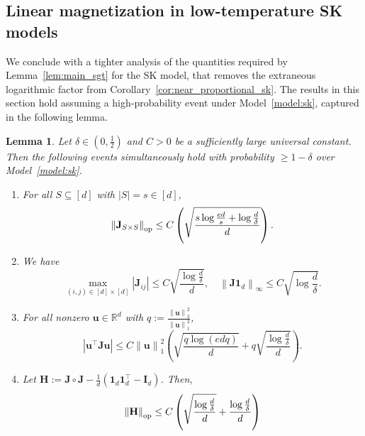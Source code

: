 \documentclass[11pt]{article}
\newtheorem{lemma}{Lemma}
\newcommand{\defeq}{:=}
\newcommand{\norm}[1]{\left\lVert#1\right\rVert}
\newcommand{\normop}[1]{\left\lVert#1\right\rVert_{\textup{op}}}
\newcommand{\R}{\mathbb{R}}
\newcommand{\half}{\frac{1}{2}}
\newcommand{\1}{\mathbf{1}}
\newcommand{\0}{\mathbf{0}}
\newcommand{\id}{\mathbf{I}}
\newcommand{\Par}[1]{\left(#1\right)}
\newcommand{\Abs}[1]{\left|#1\right|}
\newcommand{\mh}{{\mathbf{H}}}
\newcommand{\mj}{{\mathbf{J}}}
\newcommand{\vu}{{\mathbf{u}}}
\begin{document}
\subsection{Linear magnetization in low-temperature SK models}\label{ssec:d_sk}

We conclude with a tighter analysis of the quantities required by Lemma~\ref{lem:main_sgt} for the SK model, that removes the extraneous logarithmic factor from Corollary~\ref{cor:near_proportional_sk}. The results in this section hold assuming a high-probability event under Model~\ref{model:sk}, captured in the following lemma.

\begin{lemma}\label{lem:conditions_sk}
Let $\delta \in (0, \half)$ and $C > 0$ be a sufficiently large universal constant. Then the following events simultaneously hold with probability $\ge 1 - \delta$ over Model~\ref{model:sk}.
\begin{enumerate}
    \item For all $S \subseteq [d]$ with $|S| = s \in [d]$,
    \[\normop{\mj_{S \times S}} \le C\Par{\sqrt{\frac{s\log \frac {ed} s + \log \frac d \delta}{d}}}.\]\label{item:subset_opnorm}
    \item We have
    \[\max_{(i, j) \in [d] \times [d]} |\mj_{ij}| \le C\sqrt{\frac{\log \frac d \delta} d},\quad \norm{\mj \1_d}_\infty \le C\sqrt{\log \frac d \delta}.\]\label{item:entry_column_bound}
    \item For all nonzero $\vu \in \R^d$ with $q \defeq \frac{\norm{\vu}_2^2}{\norm{\vu}_1^2}$,
    \[\Abs{\vu^\top \mj \vu} \le C\norm{\vu}_1^2\Par{\sqrt{\frac{q\log(edq)}{d}} + q\sqrt{\frac{\log \frac d\delta}{d}}}.\]\label{item:l2l1_bound}
    \item Let $\mh \defeq \mj \circ \mj - \frac 1 d (\1_d\1_d^\top - \id_d)$. Then,
    \[\normop{\mh} \le C\Par{\sqrt{\frac{\log \frac d \delta}{d}} + \frac{\log \frac d \delta} d}\]\label{item:hadamard_bound}
\end{enumerate}
\end{lemma}
\end{document}
